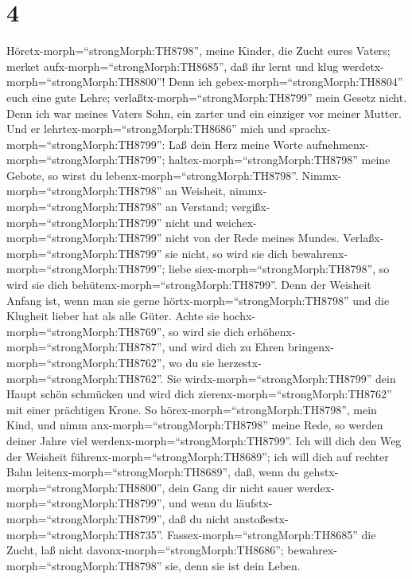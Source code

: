 \hypertarget{section-3}{%
\section{4}\label{section-3}}

 Höretx-morph=``strongMorph:TH8798'', meine Kinder, die
Zucht eures Vaters; merket aufx-morph=``strongMorph:TH8685'', daß ihr
lernt und klug werdetx-morph=``strongMorph:TH8800''!  Denn
ich gebex-morph=``strongMorph:TH8804'' euch eine gute Lehre;
verlaßtx-morph=``strongMorph:TH8799'' mein Gesetz nicht. 
Denn ich war meines Vaters Sohn, ein zarter und ein einziger vor meiner
Mutter.  Und er lehrtex-morph=``strongMorph:TH8686'' mich
und sprachx-morph=``strongMorph:TH8799'': Laß dein Herz meine Worte
aufnehmenx-morph=``strongMorph:TH8799'';
haltex-morph=``strongMorph:TH8798'' meine Gebote, so wirst du
lebenx-morph=``strongMorph:TH8798''. 
Nimmx-morph=``strongMorph:TH8798'' an Weisheit,
nimmx-morph=``strongMorph:TH8798'' an Verstand;
vergißx-morph=``strongMorph:TH8799'' nicht und
weichex-morph=``strongMorph:TH8799'' nicht von der Rede meines Mundes.
 Verlaßx-morph=``strongMorph:TH8799'' sie nicht, so wird sie
dich bewahrenx-morph=``strongMorph:TH8799''; liebe
siex-morph=``strongMorph:TH8798'', so wird sie dich
behütenx-morph=``strongMorph:TH8799''.  Denn der Weisheit
Anfang ist, wenn man sie gerne hörtx-morph=``strongMorph:TH8798'' und
die Klugheit lieber hat als alle Güter.  Achte sie
hochx-morph=``strongMorph:TH8769'', so wird sie dich
erhöhenx-morph=``strongMorph:TH8787'', und wird dich zu Ehren
bringenx-morph=``strongMorph:TH8762'', wo du sie
herzestx-morph=``strongMorph:TH8762''.  Sie
wirdx-morph=``strongMorph:TH8799'' dein Haupt schön schmücken und wird
dich zierenx-morph=``strongMorph:TH8762'' mit einer prächtigen Krone.
 So hörex-morph=``strongMorph:TH8798'', mein Kind, und nimm
anx-morph=``strongMorph:TH8798'' meine Rede, so werden deiner Jahre viel
werdenx-morph=``strongMorph:TH8799''.  Ich will dich den
Weg der Weisheit führenx-morph=``strongMorph:TH8689''; ich will dich auf
rechter Bahn leitenx-morph=``strongMorph:TH8689'',  daß,
wenn du gehstx-morph=``strongMorph:TH8800'', dein Gang dir nicht sauer
werdex-morph=``strongMorph:TH8799'', und wenn du
läufstx-morph=``strongMorph:TH8799'', daß du nicht
anstoßestx-morph=``strongMorph:TH8735''. 
Fassex-morph=``strongMorph:TH8685'' die Zucht, laß nicht
davonx-morph=``strongMorph:TH8686'';
bewahrex-morph=``strongMorph:TH8798'' sie, denn sie ist dein Leben.
